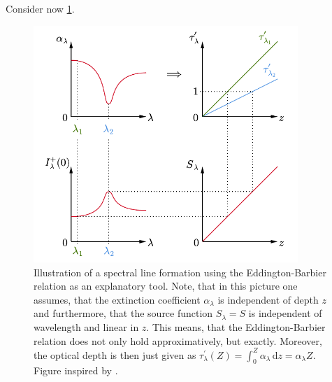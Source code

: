 \documentclass[a4paper,11pt]{report}
\begin{document}
Consider now \cref{fig:spectrallineformation}.
\begin{figure}[h]
\centering
\includegraphics[width=10cm]{figures/spectrallineformation.pdf}
\caption{Illustration of a spectral line formation using the Eddington-Barbier relation as an explanatory tool. Note, that in this picture one assumes, that the extinction coefficient $\alpha_\lambda$ is independent of depth $z$ and furthermore, that the source function $S_\lambda = S$ is independent of wavelength and linear in $z$. This means, that the Eddington-Barbier relation does not only hold approximatively, but exactly. Moreover, the optical depth is then just given as $\tau_\lambda^\prime(Z) = \int_{0}^{Z}\alpha_\lambda\,\mathrm{d}z = \alpha_\lambda Z$. Figure inspired by \cite[p.38]{Rutten.2015}.}
\label{fig:spectrallineformation}
\end{figure}
\end{document}
